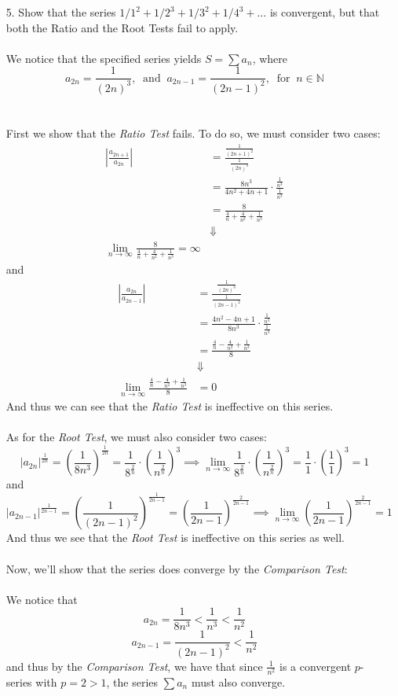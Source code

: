 \documentclass[12pt,letterpaper]{article}
\newcommand{\limx}[2]{\displaystyle\lim\limits_{#1 \to #2}}
\newcommand{\abs}[1]{\left\lvert #1 \right\rvert}
\newcommand{\N}{\mathbb{N}}
\theoremstyle{case}
\theoremstyle{definition}
\begin{document}
\begin{enumerate}
\begin{enumerate}
			\item[5.] Show that the series $1/1^2+1/2^3+1/3^2+1/4^3+\dots$ is convergent, but that both the Ratio and the Root Tests fail to apply.
			\\\\We notice that the specified series yields $S=\sum a_n$, where
			\[a_{2n}=\frac{1}{(2n)^3},\ \text{ and }\ a_{2n-1}=\frac{1}{(2n-1)^2},\ \text{ for }\ n \in \N\]
			\\\\First we show that the \textit{Ratio Test} fails. To do so, we must consider two cases:
			\begin{align*}
				\abs{\frac{a_{2n+1}}{a_{2n}}} &= \frac{\frac{1}{(2n+1)^2}}{\frac{1}{(2n)^3}} \\
				&= \frac{8n^3}{4n^2+4n+1} \cdot \frac{\frac{1}{n^3}}{\frac{1}{n^3}} \\
				&= \frac{8}{\frac{4}{n}+\frac{4}{n^2}+\frac{1}{n^3}} \\
				&\Downarrow \\
				\limx{n}{\infty} \frac{8}{\frac{4}{n}+\frac{4}{n^2}+\frac{1}{n^3}} = \infty
			\end{align*}
			and
			\begin{align*}
				\abs{\frac{a_{2n}}{a_{2n-1}}} &= \frac{\frac{1}{(2n)^3}}{\frac{1}{(2n-1)^2}} \\
				&= \frac{4n^2-4n+1}{8n^3} \cdot \frac{\frac{1}{n^3}}{\frac{1}{n^3}} \\
				&= \frac{\frac{4}{n}-\frac{4}{n^2}+\frac{1}{n^3}}{8} \\
				&\Downarrow \\
				\limx{n}{\infty} \frac{\frac{4}{n}-\frac{4}{n^2}+\frac{1}{n^3}}{8} &= 0
			\end{align*}
			And thus we can see that the \textit{Ratio Test} is ineffective on this series.
			\\\\As for the \textit{Root Test}, we must also consider two cases:
			\[\abs{a_{2n}}^{\frac{1}{2n}}=\left(\frac{1}{8n^3}\right)^{\frac{1}{2n}}=\frac{1}{8^\frac{2}{n}}\cdot \left(\frac{1}{n^{\frac{2}{n}}}\right)^3\implies \limx{n}{\infty} \frac{1}{8^\frac{2}{n}}\cdot \left(\frac{1}{n^{\frac{2}{n}}}\right)^3 = \frac{1}{1} \cdot \left(\frac{1}{1}\right)^3=1\]
			and
			\[\abs{a_{2n-1}}^{\frac{1}{2n-1}}=\left(\frac{1}{(2n-1)^2}\right)^{\frac{1}{2n-1}}=\left(\frac{1}{2n-1}\right)^{\frac{2}{2n-1}} \implies \limx{n}{\infty} \left(\frac{1}{2n-1}\right)^{\frac{2}{2n-1}}=1\]
			And thus we see that the \textit{Root Test} is ineffective on this series as well.
			\\\\Now, we'll show that the series does converge by the \textit{Comparison Test}:
			\\\\We notice that
			\[a_{2n}=\frac{1}{8n^3}<\frac{1}{n^3}<\frac{1}{n^2}\]
			\[a_{2n-1}=\frac{1}{(2n-1)^2}<\frac{1}{n^2}\]
			and thus by the \textit{Comparison Test}, we have that since $\frac{1}{n^2}$ is a convergent $p$-series with $p=2>1$, the series $\sum a_n$ must also converge.\\
			

\end{enumerate}
\end{enumerate}
\end{document}
